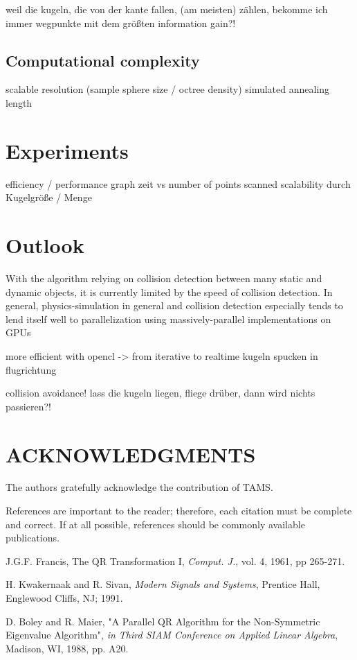 \documentclass[letterpaper, 10 pt, conference]{ieeeconf}  %
\begin{document}
weil die kugeln, die von der kante fallen, (am meisten) zählen, bekomme ich immer wegpunkte mit dem größten information gain?!

\subsection{Computational complexity}

scalable resolution (sample sphere size / octree density)
simulated annealing length

\section{Experiments}
efficiency / performance
graph zeit vs number of points scanned
scalability durch Kugelgröße / Menge

\section{Outlook}

With the algorithm relying on collision detection between many static and dynamic objects, it is currently limited by the speed of collision detection. In general, physics-simulation in general and collision detection especially tends to lend itself well to parallelization using massively-parallel implementations on GPUs

more efficient with opencl -> from iterative to realtime
kugeln spucken in flugrichtung

collision avoidance! lass die kugeln liegen, fliege drüber, dann wird nichts passieren?!


\section{ACKNOWLEDGMENTS}

The authors gratefully acknowledge the contribution of TAMS.



References are important to the reader; therefore, each citation must be complete and correct. If at all possible, references should be commonly available publications.

\begin{thebibliography}{99}

J.G.F. Francis, The QR Transformation I, {\it Comput. J.}, vol. 4, 1961, pp 265-271.

H. Kwakernaak and R. Sivan, {\it Modern Signals and Systems}, Prentice Hall, Englewood Cliffs, NJ; 1991.

D. Boley and R. Maier, "A Parallel QR Algorithm for the Non-Symmetric Eigenvalue Algorithm", {\it in Third SIAM Conference on Applied Linear Algebra}, Madison, WI, 1988, pp. A20.

\end{thebibliography}
\end{document}
